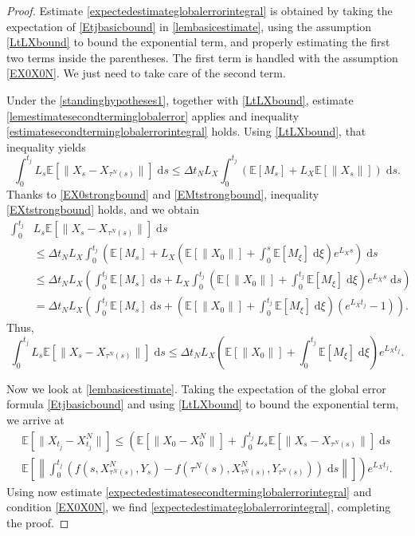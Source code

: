 \documentclass[reqno,12pt]{amsart}
\theoremstyle{plain} %
\theoremstyle{definition} %
\begin{document}
\begin{proof}
    Estimate \eqref{expectedestimateglobalerrorintegral} is obtained by taking the expectation of \eqref{Etjbasicbound} in \cref{lembasicestimate}, using the assumption \eqref{LtLXbound} to bound the exponential term, and properly estimating the first two terms inside the parentheses. The first term is handled with the assumption \eqref{EX0X0N}. We just need to take care of the second term.
    
    Under the \cref{standinghypotheses1}, together with \eqref{LtLXbound}, estimate \cref{lemestimatesecondterminglobalerror} applies and inequality \eqref{estimatesecondterminglobalerrorintegral} holds.
    Using \eqref{LtLXbound}, that inequality yields
    \[
        \int_0^{t_j} L_s \mathbb{E}[\|X_s - X_{\tau^N(s)}\|] \;\mathrm{d}s \leq \Delta t_N L_X \int_0^{t_j} (\mathbb{E}[M_s] + L_X\mathbb{E}[\|X_s\|]) \;\mathrm{d}s.
    \]
    Thanks to \eqref{EX0strongbound} and \eqref{EMtstrongbound}, inequality \eqref{EXtstrongbound} holds, and we obtain
    \begin{align*}
        \int_0^{t_j} & L_s \mathbb{E}[\|X_s - X_{\tau^N(s)}\|] \;\mathrm{d}s \\
        & \leq \Delta t_N L_X \int_0^{t_j} \left(\mathbb{E}[M_s] + L_X\left(\mathbb{E}[\|X_0\|] + \int_0^s \mathbb{E}[M_\xi]\;\mathrm{d}\xi\right)e^{L_X s} \right)\;\mathrm{d}s \\
        & \leq \Delta t_N L_X \left(\int_0^{t_j} \mathbb{E}[M_s] \;\mathrm{d}s + L_X \int_0^{t_j}\left(\mathbb{E}[\|X_0\|] + \int_0^{t_j} \mathbb{E}[M_\xi]\;\mathrm{d}\xi\right)e^{L_X s} \;\mathrm{d}s\right) \\
        & = \Delta t_N L_X \left(\int_0^{t_j} \mathbb{E}[M_s] \;\mathrm{d}s + \left(\mathbb{E}[\|X_0\|] + \int_0^{t_j} \mathbb{E}[M_\xi]\;\mathrm{d}\xi\right)\left(e^{L_X t_j} - 1\right) \right).
    \end{align*}
    Thus,
    \begin{equation}
        \label{expectedestimatesecondterminglobalerrorintegral}
        \int_0^{t_j} L_s \mathbb{E}[\|X_s - X_{\tau^N(s)}\|] \;\mathrm{d}s \leq \Delta t_N L_X \left(\mathbb{E}[\|X_0\|] + \int_0^{t_j} \mathbb{E}[M_\xi]\;\mathrm{d}\xi\right)e^{L_X t_j}.
    \end{equation}

    Now we look at \cref{lembasicestimate}. Taking the expectation of the global error formula \eqref{Etjbasicbound} and using \eqref{LtLXbound} to bound the exponential term, we arrive at
    \begin{multline*}
        \mathbb{E}\left[\|X_{t_j} - X_{t_j}^N\|\right] \leq \left( \mathbb{E}\left[\|X_0 - X_0^N\|\right] + \int_0^{t_j} L_s \mathbb{E}\left[\|X_s - X_{\tau^N(s)}\|\right] \;\mathrm{d}s \right. \\
        \left. \mathbb{E}\left[\left\|\int_0^{t_j} \left( f(s, X_{\tau^N(s)}^N, Y_s) - f(\tau^N(s), X_{\tau^N(s)}^N, Y_{\tau^N(s)}) \right)\;\mathrm{d}s\right\|\right]\right) e^{L_X t_j}.
    \end{multline*}
    Using now estimate \eqref{expectedestimatesecondterminglobalerrorintegral} and condition \eqref{EX0X0N}, we find \eqref{expectedestimateglobalerrorintegral}, completing the proof.
\end{proof}
\end{document}
